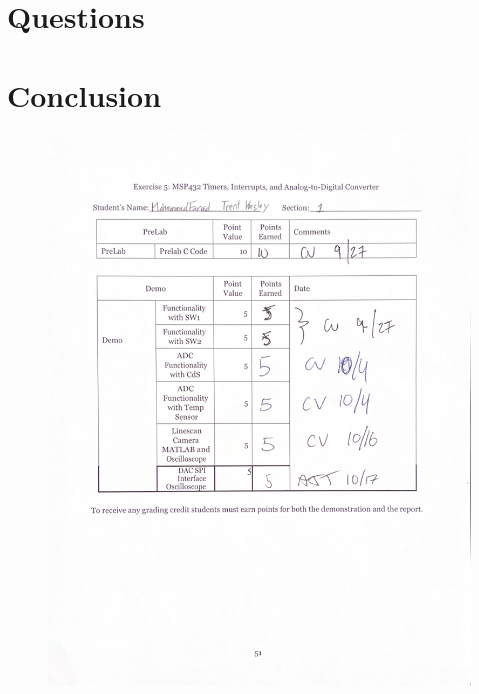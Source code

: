 \documentclass[CMPE]{KGCOEReport}
\begin{document}
\section*{Questions}

\section*{Conclusion}

\newpage
\begin{figure}[H]
    \centering
    \begin{adjustbox}{center}
        \includegraphics[width=1.26\textwidth]{signoff.pdf}
    \end{adjustbox}
\end{figure}
\end{document}
